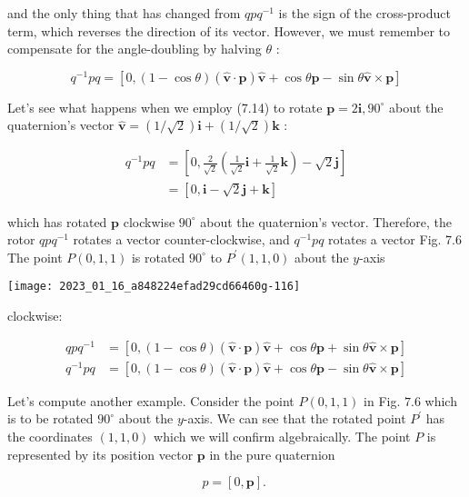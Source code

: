 and the only thing that has changed from $q p q^{-1}$ is the sign of the cross-product term, which reverses the direction of its vector. However, we must remember to compensate for the angle-doubling by halving $\theta$ :

$$
q^{-1} p q=[0,(1-\cos \theta)(\hat{\mathbf{v}} \cdot \mathbf{p}) \hat{\mathbf{v}}+\cos \theta \mathbf{p}-\sin \theta \hat{\mathbf{v}} \times \mathbf{p}]
$$

Let's see what happens when we employ (7.14) to rotate $\mathbf{p}=2 \mathbf{i}, 90^{\circ}$ about the quaternion's vector $\hat{\mathbf{v}}=(1 / \sqrt{2}) \mathbf{i}+(1 / \sqrt{2}) \mathbf{k}$ :

$$
\begin{aligned}
q^{-1} p q & =\left[0, \frac{2}{\sqrt{2}}\left(\frac{1}{\sqrt{2}} \mathbf{i}+\frac{1}{\sqrt{2}} \mathbf{k}\right)-\sqrt{2} \mathbf{j}\right] \\
& =[0, \mathbf{i}-\sqrt{2} \mathbf{j}+\mathbf{k}]
\end{aligned}
$$

which has rotated $\mathbf{p}$ clockwise $90^{\circ}$ about the quaternion's vector. Therefore, the rotor $q p q^{-1}$ rotates a vector counter-clockwise, and $q^{-1} p q$ rotates a vector Fig. 7.6 The point $P(0,1,1)$ is rotated $90^{\circ}$ to $P^{\prime}(1,1,0)$ about the $y$-axis

\begin{center}
\texttt{[image: 2023\_01\_16\_a848224efad29cd66460g-116]}
\end{center}

clockwise:

$$
\begin{aligned}
q p q^{-1} & =[0,(1-\cos \theta)(\hat{\mathbf{v}} \cdot \mathbf{p}) \hat{\mathbf{v}}+\cos \theta \mathbf{p}+\sin \theta \hat{\mathbf{v}} \times \mathbf{p}] \\
q^{-1} p q & =[0,(1-\cos \theta)(\hat{\mathbf{v}} \cdot \mathbf{p}) \hat{\mathbf{v}}+\cos \theta \mathbf{p}-\sin \theta \hat{\mathbf{v}} \times \mathbf{p}]
\end{aligned}
$$

Let's compute another example. Consider the point $P(0,1,1)$ in Fig. $7.6$ which is to be rotated $90^{\circ}$ about the $y$-axis. We can see that the rotated point $P^{\prime}$ has the coordinates $(1,1,0)$ which we will confirm algebraically. The point $P$ is represented by its position vector $\mathbf{p}$ in the pure quaternion

$$
p=[0, \mathbf{p}] \text {. }
$$

